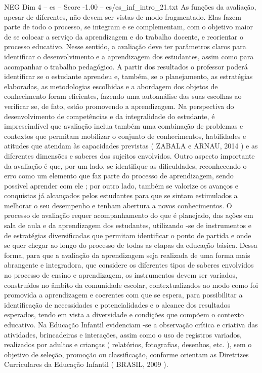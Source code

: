 \begin{textsample}{NEG Dim 4 – es – Score -1.00 – es/es\_inf\_intro\_21.txt}  \label{ex:f4_neg_219}
As funções da avaliação, apesar de diferentes, não devem ser vistas de modo fragmentado.
Elas fazem parte de todo o processo, se integram e se complementam, com o objetivo maior de se colocar a serviço da aprendizagem e do trabalho docente, e reorientar o processo educativo.
Nesse sentido, a avaliação deve ter parâmetros claros para identificar o desenvolvimento e a aprendizagem dos estudantes, assim como para acompanhar o trabalho pedagógico.
A partir dos resultados o professor poderá identificar se o estudante aprendeu e, também, se o planejamento, as estratégias elaboradas, as metodologias escolhidas e a abordagem dos objetos de conhecimento foram eficientes, fazendo uma autoanálise das suas escolhas ao verificar se, de fato, estão promovendo a aprendizagem.
Na perspectiva do desenvolvimento de competências e da integralidade do estudante, é imprescindível que avaliação inclua também uma combinação de problemas e contextos que permitam mobilizar o conjunto de conhecimentos, habilidades e atitudes que atendam às capacidades previstas ( ZABALA e ARNAU, 2014 ) e as diferentes dimensões e saberes dos sujeitos envolvidos.
Outro aspecto importante da avaliação é que, por um lado, se identifique as dificuldades, reconhecendo o erro como um elemento que faz parte do processo de aprendizagem, sendo possível aprender com ele ; por outro lado, também se valorize os avanços e conquistas já alcançados pelos estudantes para que se sintam estimulados a melhorar o seu desempenho e tenham abertura a novos conhecimentos.
O processo de avaliação requer acompanhamento do que é planejado, das ações em sala de aula e da aprendizagem dos estudantes, utilizando -se de instrumentos e de estratégias diversificadas que permitam identificar o ponto de partida e onde se quer chegar ao longo do processo de todas as etapas da educação básica.
Dessa forma, para que a avaliação da aprendizagem seja realizada de uma forma mais abrangente e integradora, que considere os diferentes tipos de saberes envolvidos no processo de ensino e aprendizagem, os instrumentos devem ser variados, construídos no âmbito da comunidade escolar, contextualizados ao modo como foi promovida a aprendizagem e coerentes com que se espera, para possibilitar a identificação de necessidades e potencialidades e o alcance dos resultados esperados, tendo em vista a diversidade e condições que compõem o contexto educativo.
Na Educação Infantil evidenciam -se a observação crítica e criativa das atividades, brincadeiras e interações, assim como o uso de registros variados, realizados por adultos e crianças ( relatórios, fotografias, desenhos, etc. ), sem o objetivo de seleção, promoção ou classificação, conforme orientam as Diretrizes Curriculares da Educação Infantil ( BRASIL, 2009 ).

\end{textsample}
